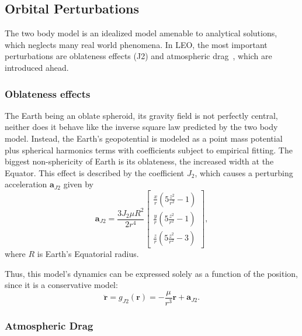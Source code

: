 \subsection{Orbital Perturbations}

The two body model is an idealized model amenable to analytical solutions, which neglects many real world phenomena. In LEO, the most important perturbations are oblateness effects (J2) and atmospheric drag~\cite{curtis2015orbital}, which are introduced ahead.

\subsubsection{Oblateness effects}

The Earth being an oblate spheroid, its gravity field is not perfectly central, neither does it behave like the inverse square law predicted by the two body model. Instead, the Earth's geopotential is modeled as a point mass potential plus spherical harmonics terms with coefficients subject to empirical fitting. The biggest non-sphericity of Earth is its oblateness, the increased width at the Equator. This effect is described by the coefficient \(J_2\), which causes a perturbing acceleration \(\mathbf{a}_{J2}\) given by
\begin{equation}\label{eq:j2_acc}
    \mathbf{a}_{J2} = \frac{3 J_2 \mu R^2}{2 r^4} \begin{bmatrix}
        \frac{x}{r} \left(5 \frac{z^2}{r^2} - 1\right) \\
        \frac{y}{r} \left(5 \frac{z^2}{r^2} - 1\right) \\
        \frac{z}{r} \left(5 \frac{z^2}{r^2} - 3\right)
    \end{bmatrix},
\end{equation}
where \(R\) is Earth's Equatorial radius.

Thus, this model's dynamics can be expressed solely as a function of the position, since it is a conservative model:
\begin{equation}\label{eq:j2_dyn}
    \ddot{\mathbf{r}} = g_{J2}(\mathbf{r}) = -\frac{\mu}{r^3} \mathbf{r} + \mathbf{a}_{J2}.
\end{equation}

\subsubsection{Atmospheric Drag}\label{sssec:drag}

